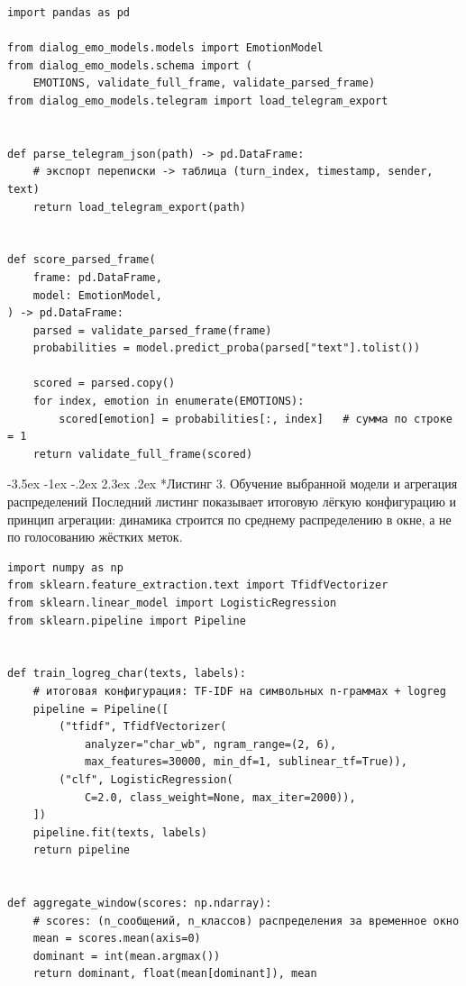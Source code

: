 \documentclass[12pt,a4paper]{report}
\makeatletter
\renewcommand{\section}{\@startsection{section}{1}{\z@}%
  {-3.5ex \@plus -1ex \@minus -.2ex}%
  {2.3ex \@plus .2ex}%
  {\normalfont\large\bfseries\centering}}
\makeatother
\begin{document}
\begin{verbatim}
import pandas as pd

from dialog_emo_models.models import EmotionModel
from dialog_emo_models.schema import (
    EMOTIONS, validate_full_frame, validate_parsed_frame)
from dialog_emo_models.telegram import load_telegram_export


def parse_telegram_json(path) -> pd.DataFrame:
    # экспорт переписки -> таблица (turn_index, timestamp, sender, text)
    return load_telegram_export(path)


def score_parsed_frame(
    frame: pd.DataFrame,
    model: EmotionModel,
) -> pd.DataFrame:
    parsed = validate_parsed_frame(frame)
    probabilities = model.predict_proba(parsed["text"].tolist())

    scored = parsed.copy()
    for index, emotion in enumerate(EMOTIONS):
        scored[emotion] = probabilities[:, index]   # сумма по строке = 1
    return validate_full_frame(scored)
\end{verbatim}

\clearpage
\section*{Листинг 3. Обучение выбранной модели и агрегация распределений}
Последний листинг показывает итоговую лёгкую конфигурацию и принцип агрегации: динамика строится по среднему распределению в окне, а не по голосованию жёстких меток.

\begin{verbatim}
import numpy as np
from sklearn.feature_extraction.text import TfidfVectorizer
from sklearn.linear_model import LogisticRegression
from sklearn.pipeline import Pipeline


def train_logreg_char(texts, labels):
    # итоговая конфигурация: TF-IDF на символьных n-граммах + logreg
    pipeline = Pipeline([
        ("tfidf", TfidfVectorizer(
            analyzer="char_wb", ngram_range=(2, 6),
            max_features=30000, min_df=1, sublinear_tf=True)),
        ("clf", LogisticRegression(
            C=2.0, class_weight=None, max_iter=2000)),
    ])
    pipeline.fit(texts, labels)
    return pipeline


def aggregate_window(scores: np.ndarray):
    # scores: (n_сообщений, n_классов) распределения за временное окно
    mean = scores.mean(axis=0)
    dominant = int(mean.argmax())
    return dominant, float(mean[dominant]), mean
\end{verbatim}

\endgroup
\end{document}
